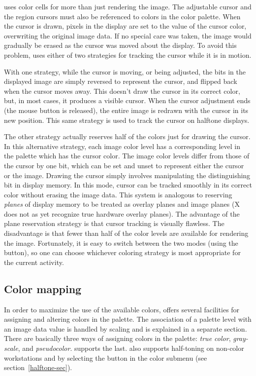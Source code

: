 {\SAO} uses color cells for more than just rendering the image.  The
adjustable cursor and the region cursors must also be referenced to colors
in the color palette.  When the cursor is drawn, pixels in the display are
set to the value of the cursor color, overwriting the original image data.
If no special care was taken, the image would gradually be erased as the
cursor was moved about the display.  To avoid this problem, {\SAO} uses
either of two strategies for tracking the cursor while it is in motion.

With one strategy, while the cursor is moving, or being adjusted, the
bits in the displayed image are simply reversed to represent the cursor,
and flipped back when the cursor moves away.  This doesn't draw the cursor
in its correct color, but, in most cases, it produces a visible cursor.
When the cursor adjustment ends (the mouse button is released), the
entire image is redrawn with the cursor in its new position.  This same
strategy is used to track the cursor on halftone displays.

The other strategy actually reserves half of the colors just for drawing
the cursor.  In this alternative strategy, each image color level has a
corresponding level in the palette which has the cursor color.  The image
color levels differ from those of the cursor by one bit, which can be set
and unset to represent either the cursor or the image.  Drawing the cursor
simply involves manipulating the distinguishing bit in display memory.  In
this mode, cursor can be tracked smoothly in its correct color without
erasing the image data.  This system is analogous to reserving {\em planes} of
display memory to be treated as overlay planes and image planes (X does
not as yet recognize true hardware overlay planes).  The advantage of the
plane reservation strategy is that cursor tracking is visually flawless.
The disadvantage is that fewer than half of the color levels are available
for rendering the image.  Fortunately, it is easy to switch between the
two modes (using the  button), so one can choose whichever coloring
strategy is most appropriate for the current activity.

\subsection{ Color mapping }

In order to maximize the use of the available colors, {\SAO} offers
several facilities for assigning and altering colors in the palette.
The association of a palette level with an image data value is handled by
scaling and is explained in a separate section.  There are basically three
ways of assigning colors in the palette: {\em true color}, {\em gray-scale},
and {\em pseudocolor}.  {\SAO} supports the last.  {\SAO} also supports
half-toning on non-color workstations and by selecting the  button
in the color submenu (see section~\ref{halftone-sec}).

